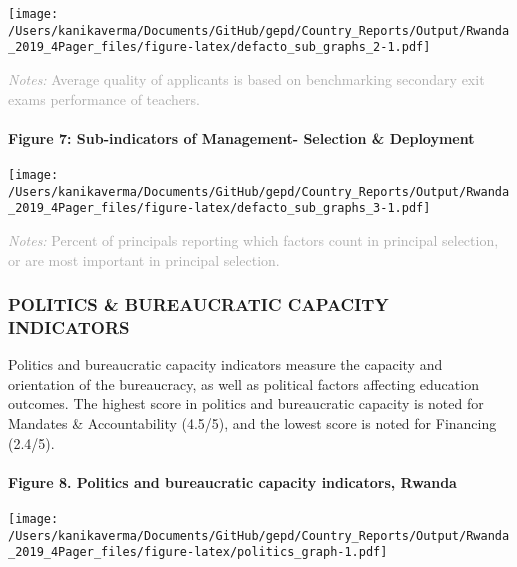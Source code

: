 \documentclass[
  twocolumn]{article}
\begin{document}
\texttt{[image: /Users/kanikaverma/Documents/GitHub/gepd/Country\_Reports/Output/Rwanda\_2019\_4Pager\_files/figure-latex/defacto\_sub\_graphs\_2-1.pdf]}

{\scriptsize
    \textcolor{darkgray}{\textit{Notes:} Average quality of applicants is based on benchmarking secondary exit exams performance of teachers.}
  }

\hypertarget{figure-7-sub-indicators-of-management--selection-deployment}{%
\paragraph{Figure 7: Sub-indicators of Management- Selection \&
Deployment}\label{figure-7-sub-indicators-of-management--selection-deployment}}

\texttt{[image: /Users/kanikaverma/Documents/GitHub/gepd/Country\_Reports/Output/Rwanda\_2019\_4Pager\_files/figure-latex/defacto\_sub\_graphs\_3-1.pdf]}

{\scriptsize
    \textcolor{darkgray}{\textit{Notes:} Percent of principals reporting which factors count in principal selection, or are most important in principal selection.}
  }

\vfill\null

\hypertarget{politics-bureaucratic-capacity-indicators}{%
\subsubsection{\texorpdfstring{\textbf{POLITICS \& BUREAUCRATIC CAPACITY
INDICATORS}}{POLITICS \& BUREAUCRATIC CAPACITY INDICATORS}}\label{politics-bureaucratic-capacity-indicators}}

Politics and bureaucratic capacity indicators measure the capacity and
orientation of the bureaucracy, as well as political factors affecting
education outcomes. The highest score in politics and bureaucratic
capacity is noted for Mandates \& Accountability (4.5/5), and the lowest
score is noted for Financing (2.4/5).

\hypertarget{figure-8.-politics-and-bureaucratic-capacity-indicators-rwanda}{%
\paragraph{Figure 8. Politics and bureaucratic capacity indicators,
Rwanda}\label{figure-8.-politics-and-bureaucratic-capacity-indicators-rwanda}}

\texttt{[image: /Users/kanikaverma/Documents/GitHub/gepd/Country\_Reports/Output/Rwanda\_2019\_4Pager\_files/figure-latex/politics\_graph-1.pdf]}
\end{document}
